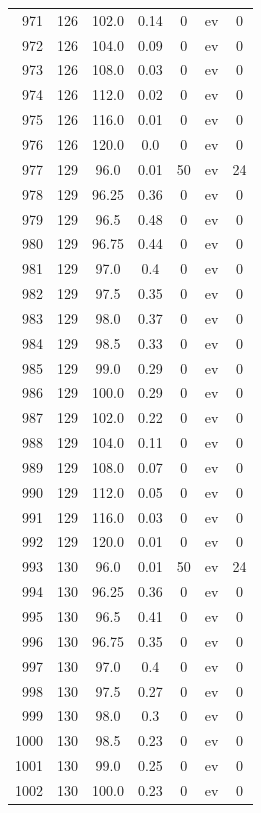 \documentclass[12pt,a4paper]{article}
\begin{document}
\begin{tabular}{r|cccccc}
	971 & 126 & 102.0 & 0.14 & 0 & ev & 0 \\
	972 & 126 & 104.0 & 0.09 & 0 & ev & 0 \\
	973 & 126 & 108.0 & 0.03 & 0 & ev & 0 \\
	974 & 126 & 112.0 & 0.02 & 0 & ev & 0 \\
	975 & 126 & 116.0 & 0.01 & 0 & ev & 0 \\
	976 & 126 & 120.0 & 0.0 & 0 & ev & 0 \\
	977 & 129 & 96.0 & 0.01 & 50 & ev & 24 \\
	978 & 129 & 96.25 & 0.36 & 0 & ev & 0 \\
	979 & 129 & 96.5 & 0.48 & 0 & ev & 0 \\
	980 & 129 & 96.75 & 0.44 & 0 & ev & 0 \\
	981 & 129 & 97.0 & 0.4 & 0 & ev & 0 \\
	982 & 129 & 97.5 & 0.35 & 0 & ev & 0 \\
	983 & 129 & 98.0 & 0.37 & 0 & ev & 0 \\
	984 & 129 & 98.5 & 0.33 & 0 & ev & 0 \\
	985 & 129 & 99.0 & 0.29 & 0 & ev & 0 \\
	986 & 129 & 100.0 & 0.29 & 0 & ev & 0 \\
	987 & 129 & 102.0 & 0.22 & 0 & ev & 0 \\
	988 & 129 & 104.0 & 0.11 & 0 & ev & 0 \\
	989 & 129 & 108.0 & 0.07 & 0 & ev & 0 \\
	990 & 129 & 112.0 & 0.05 & 0 & ev & 0 \\
	991 & 129 & 116.0 & 0.03 & 0 & ev & 0 \\
	992 & 129 & 120.0 & 0.01 & 0 & ev & 0 \\
	993 & 130 & 96.0 & 0.01 & 50 & ev & 24 \\
	994 & 130 & 96.25 & 0.36 & 0 & ev & 0 \\
	995 & 130 & 96.5 & 0.41 & 0 & ev & 0 \\
	996 & 130 & 96.75 & 0.35 & 0 & ev & 0 \\
	997 & 130 & 97.0 & 0.4 & 0 & ev & 0 \\
	998 & 130 & 97.5 & 0.27 & 0 & ev & 0 \\
	999 & 130 & 98.0 & 0.3 & 0 & ev & 0 \\
	1000 & 130 & 98.5 & 0.23 & 0 & ev & 0 \\
	1001 & 130 & 99.0 & 0.25 & 0 & ev & 0 \\
	1002 & 130 & 100.0 & 0.23 & 0 & ev & 0 \\

\end{tabular}
\end{document}
